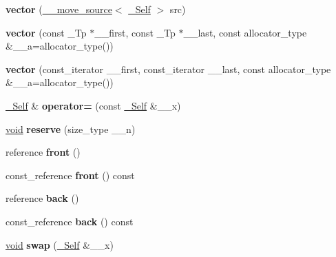 \begin{DoxyCompactItemize}
\item 
\mbox{\label{structvector_a454e6a51108b8425877350149688b493}} 
{\bfseries vector} (\hyperlink{class____move__source}{\+\_\+\+\_\+move\+\_\+source}$<$ \hyperlink{structvector}{\+\_\+\+Self} $>$ src)
\item 
\mbox{\label{structvector_af31c912c2807af1d39f61d262f33d27f}} 
{\bfseries vector} (const \+\_\+\+Tp $\ast$\+\_\+\+\_\+first, const \+\_\+\+Tp $\ast$\+\_\+\+\_\+last, const allocator\+\_\+type \&\+\_\+\+\_\+a=allocator\+\_\+type())
\item 
\mbox{\label{structvector_a8680f0f437d7168763c4599d11641b7c}} 
{\bfseries vector} (const\+\_\+iterator \+\_\+\+\_\+first, const\+\_\+iterator \+\_\+\+\_\+last, const allocator\+\_\+type \&\+\_\+\+\_\+a=allocator\+\_\+type())
\item 
\mbox{\label{structvector_a2bc4102127c1bc24a6409ad432531b0d}} 
\hyperlink{structvector}{\+\_\+\+Self} \& {\bfseries operator=} (const \hyperlink{structvector}{\+\_\+\+Self} \&\+\_\+\+\_\+x)
\item 
\mbox{\label{structvector_af445f9328f157a6e293158b9a74b32b7}} 
\hyperlink{interfacevoid}{void} {\bfseries reserve} (size\+\_\+type \+\_\+\+\_\+n)
\item 
\mbox{\label{structvector_a66b28c19e75658deb328ef3833997032}} 
reference {\bfseries front} ()
\item 
\mbox{\label{structvector_a96ceb5fda806c57779fdf6205e9cde9d}} 
const\+\_\+reference {\bfseries front} () const
\item 
\mbox{\label{structvector_a3652040e07cee889a7bd4efee5f18532}} 
reference {\bfseries back} ()
\item 
\mbox{\label{structvector_afc391e6b19dc3624fe9f017844a54ce6}} 
const\+\_\+reference {\bfseries back} () const
\item 
\mbox{\label{structvector_a954adb8b00a9f3c34e29db09b9b8b582}} 
\hyperlink{interfacevoid}{void} {\bfseries swap} (\hyperlink{structvector}{\+\_\+\+Self} \&\+\_\+\+\_\+x)

\end{DoxyCompactItemize}
